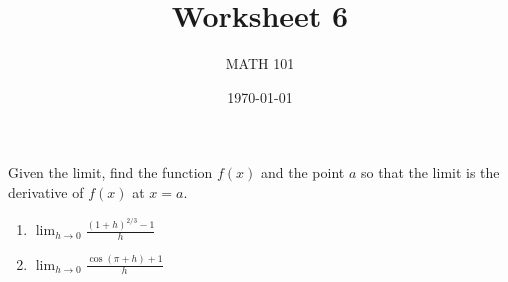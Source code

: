 \documentclass[12pt]{amsart}
\title{ Worksheet 6}
\author{MATH 101}
\date{\today}
\begin{document}
\maketitle



\begin{question}
	Given the limit, find the function $f(x)$ and the point $a$ so that the limit
	is the derivative of $f(x)$ at $x=a$.

	\begin{enumerate}
		\item $\displaystyle \lim_{h\to 0} \frac{ (1 + h)^{2/3} -1}{h}$
		      \vspace{5cm}
		\item $\displaystyle \lim_{h\to 0} \frac{ \cos(\pi + h) + 1}{h}$
		      \vspace{5cm}
	\end{enumerate}
\end{question}
\end{document}
